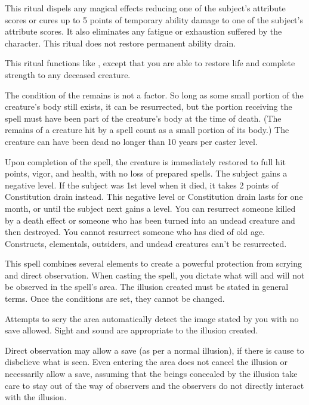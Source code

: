 \spelleffect This ritual dispels any magical effects reducing one of the subject's attribute scores or cures up to 5 points of temporary ability damage to one of the subject's attribute scores. It also eliminates any fatigue or exhaustion suffered by the character.
\spellnotes This ritual does not restore permanent ability drain.

\spelleffect This ritual functions like , except that you are able to restore life and complete strength to any deceased creature.
\par The condition of the remains is not a factor. So long as some small portion of the creature's body still exists, it can be resurrected, but the portion receiving the spell must have been part of the creature's body at the time of death. (The remains of a creature hit by a  spell count as a small portion of its body.) The creature can have been dead no longer than 10 years per caster level.
\par Upon completion of the spell, the creature is immediately restored to full hit points, vigor, and health, with no loss of prepared spells. The subject gains a negative level. If the subject was 1st level when it died, it takes 2 points of Constitution drain instead. This negative level or Constitution drain lasts for one month, or until the subject next gains a level.
\spellnotes You can resurrect someone killed by a death effect or someone who has been turned into an undead creature and then destroyed. You cannot resurrect someone who has died of old age. Constructs, elementals, outsiders, and undead creatures can't be resurrected.

\spelldur{\durext}
\spelleffect This spell combines several elements to create a powerful protection from scrying and direct observation. When casting the spell, you dictate what will and will not be observed in the spell's area. The illusion created must be stated in general terms. Once the conditions are set, they cannot be changed.
\par Attempts to scry the area automatically detect the image stated by you with no save allowed. Sight and sound are appropriate to the illusion created.
\par Direct observation may allow a save (as per a normal illusion), if there is cause to disbelieve what is seen. Even entering the area does not cancel the illusion or necessarily allow a save, assuming that the beings concealed by the illusion take care to stay out of the way of observers and the observers do not directly interact with the illusion.

